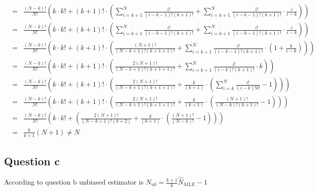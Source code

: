 \documentclass[12pt,letterpaper]{article}
\begin{document}
\begin{scriptsize}
\begin{eqnarray}
   &=& \frac{\left( N-k \right) !}{N!}\left( k\cdot k!+\left( k+1 \right) !\cdot \left( \sum_{i=k+1}^N{\frac{i!}{\left( i-k-1 \right) !\left( k+1 \right) !}}+\sum_{i=k+1}^N{\frac{i!}{\left( i-k-1 \right) !\left( k+1 \right) !}\cdot \frac{i}{i-k}} \right) \right)\nonumber\\
   &=& \frac{\left( N-k \right) !}{N!}\left( k\cdot k!+\left( k+1 \right) !\cdot \left( \sum_{i=k+1}^N{\frac{i!}{\left( i-k-1 \right) !\left( k+1 \right) !}}+\sum_{i=k+1}^N{\frac{i!}{\left( i-k-1 \right) !\left( k+1 \right) !}\cdot \frac{i}{i-k}} \right) \right)\nonumber\\
   &=& \frac{\left( N-k \right) !}{N!}\left( k\cdot k!+\left( k+1 \right) !\cdot \left( \frac{\left( N+1 \right) !}{\left( N-k+1 \right) !\left( k+1+1 \right) !}+\sum_{i=k+1}^N{\frac{i!}{\left( i-k-1 \right) !\left( k+1 \right) !}\cdot \left( 1+\frac{k}{i-k} \right)} \right) \right)\nonumber\\
   &=& \frac{\left( N-k \right) !}{N!}\left( k\cdot k!+\left( k+1 \right) !\cdot \left( \frac{2\left( N+1 \right) !}{\left( N-k+1 \right) !\left( k+1+1 \right) !}+\sum_{i=k+1}^N{\frac{i!}{\left( i-k \right) !\left( k+1 \right) !}\cdot k} \right) \right)\nonumber\\
   &=& \frac{\left( N-k \right) !}{N!}\left( k\cdot k!+\left( k+1 \right) !\cdot \left( \frac{2\left( N+1 \right) !}{\left( N-k+1 \right) !\left( k+1+1 \right) !}+\frac{k}{\left( k+1 \right)}\cdot \left( \sum_{i=k}^N{\frac{i!}{\left( i-k \right) !k!}}-1 \right) \right) \right)\nonumber\\
   &=& \frac{\left( N-k \right) !}{N!}\left( k\cdot k!+\left( k+1 \right) !\cdot \left( \frac{2\left( N+1 \right) !}{\left( N-k+1 \right) !\left( k+1+1 \right) !}+\frac{k}{\left( k+1 \right)}\cdot \left( \frac{\left( N+1 \right) !}{\left( N-k \right) !\left( k+1 \right) !}-1 \right) \right) \right)\nonumber\\
   &=& \frac{\left( N-k \right) !}{N!}\left( k\cdot k!+\left( \frac{2\left( N+1 \right) !}{\left( N-k+1 \right) !\left( k+2 \right)}+\frac{k}{\left( k+1 \right)}\cdot \left( \frac{\left( N+1 \right) !}{\left( N-k \right) !}-1 \right) \right) \right)\nonumber\\
   &=& \frac{k}{k+1}\left( N+1 \right)\ne N \nonumber
\end{eqnarray}
\end{scriptsize}


\subsection*{Question c}
According to question b unbiased estimator is $N_{ub}=\frac{k+1}{k}\hat{N}_{MLE}-1$
\end{document}
